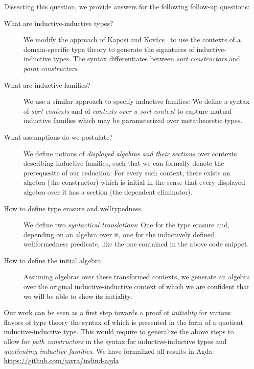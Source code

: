 \documentclass{easychair}
\begin{document}
\newpage

\noindent Dissecting this question, we provide answers for the following follow-up questions:

\begin{description}
\item[What are inductive-inductive types?]
We modify the approach of Kaposi and Kovács~\cite{qiit}
to use the contexts of a domain-specific type theory to generate the signatures
of inductive-inductive types. The syntax differentiates between \emph{sort
constructors} and \emph{point constructors}.
\item[What are inductive families?]
We use a similar approach to specify inductive families:
We define a syntax of \emph{sort contexts} and of \emph{contexts over a sort context}
to capture mutual inductive families which may be parameterized over metatheoretic
types.
\item[What assumptions do we postulate?]
We define notions of \emph{displayed algebras and their sections} over contexts
describing inductive families, such that we can formally denote the prerequesite
of our reduction:
For every such context, there exists an algebra (the constructor) which is initial
in the sense that every displayed algebra over it has a section (the dependent eliminator).
\item[How to define type erasure and welltypedness.]
We define two \emph{syntactical translations}: One for the type erasure and,
depending on an algebra over it, one for the inductively defined wellformedness
predicate, like the one contained in the above code snippet.
\item[How to define the initial algebra.]
Assuming algebras over these transformed contexts, we generate an algebra over
the original inductive-inductive context of which we are confident that we will
be able to show its initiality.
\end{description}

\noindent
Our work can be seen as a first step towards a proof of \emph{initiality}
for various flavors of type theory the syntax of which is presented in the form
of a quotient inductive-inductive type.
This would require to generalize the above steps to allow for \emph{path constructors}
in the syntax for inductive-inductive types and \emph{quotienting inductive families}.
We have formalized all results in Agda: \url{https://github.com/javra/indind-agda}



\end{document}
